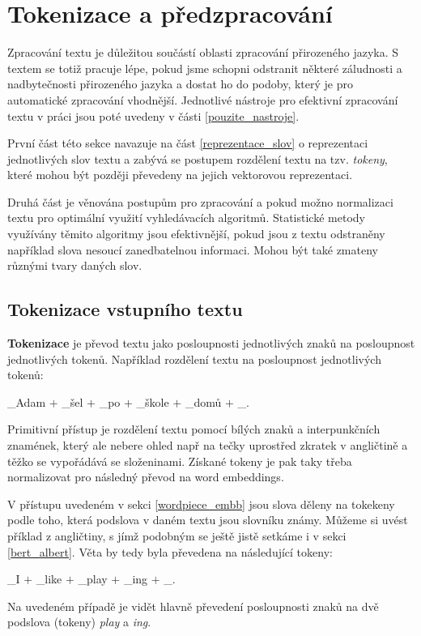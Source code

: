 \section{Tokenizace a předzpracování}
\label{preprocessing}
Zpracování textu je důležitou součástí oblasti zpracování přirozeného jazyka. S textem se totiž pracuje lépe, pokud jsme schopni odstranit některé záludnosti a nadbytečnosti přirozeného jazyka a dostat ho do podoby, který je pro automatické zpracování vhodnější. Jednotlivé nástroje pro efektivní zpracování textu v práci jsou poté uvedeny v části \ref{pouzite_nastroje}.\par
První část této sekce navazuje na část \ref{reprezentace_slov} o reprezentaci jednotlivých slov textu a zabývá se postupem rozdělení textu na tzv. \emph{tokeny}, které mohou být později převedeny na jejich vektorovou reprezentaci.\par
Druhá část je věnována postupům pro zpracování a pokud možno normalizaci textu pro optimální využití vyhledávacích algoritmů. Statistické metody využívány těmito algoritmy jsou efektivnější, pokud jsou z textu odstraněny například slova nesoucí zanedbatelnou informaci. Mohou být také zmateny různými tvary daných slov.

\subsection{Tokenizace vstupního textu}
\textbf{Tokenizace} je převod textu jako posloupnosti jednotlivých znaků na posloupnost jednotlivých tokenů. Například rozdělení textu  na posloupnost jednotlivých tokenů:
\begin{center}
    \_Adam $+$ \_šel $+$ \_po $+$ \_škole $+$ \_domů $+$ \_.
\end{center}
Primitivní přístup je rozdělení textu pomocí bílých znaků a interpunkčních znamének, který ale nebere ohled např na tečky uprostřed zkratek v angličtině a těžko se vypořádává se složeninami. Získané tokeny je pak taky třeba normalizovat pro následný převod na word embeddings.\par
V přístupu uvedeném v sekci \ref{wordpiece_embb} jsou slova děleny na tokekeny podle toho, která podslova v daném textu jsou slovníku známy. Můžeme si uvést příklad z angličtiny, s jímž podobným se ještě jistě setkáme i v sekci \ref{bert_albert}. Věta  by tedy byla převedena na následující tokeny:
\begin{center}
    \_I $+$ \_like $+$ \_play $+$ \_ing $+$ \_.
\end{center}
Na uvedeném případě je vidět hlavně převedení posloupnosti znaků  na dvě podslova (tokeny) \emph{play} a \emph{ing}.

